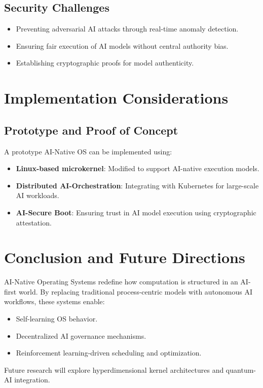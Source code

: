 \documentclass{article}
\begin{document}
\subsection{Security Challenges}
\begin{itemize}
    \item Preventing adversarial AI attacks through real-time anomaly detection.
    \item Ensuring fair execution of AI models without central authority bias.
    \item Establishing cryptographic proofs for model authenticity.
\end{itemize}

\section{Implementation Considerations}
\subsection{Prototype and Proof of Concept}
A prototype AI-Native OS can be implemented using:
\begin{itemize}
    \item \textbf{Linux-based microkernel}: Modified to support AI-native execution models.
    \item \textbf{Distributed AI-Orchestration}: Integrating with Kubernetes for large-scale AI workloads.
    \item \textbf{AI-Secure Boot}: Ensuring trust in AI model execution using cryptographic attestation.
\end{itemize}

\section{Conclusion and Future Directions}
AI-Native Operating Systems redefine how computation is structured in an AI-first world. By replacing traditional process-centric models with autonomous AI workflows, these systems enable:
\begin{itemize}
    \item Self-learning OS behavior.
    \item Decentralized AI governance mechanisms.
    \item Reinforcement learning-driven scheduling and optimization.
\end{itemize}
Future research will explore hyperdimensional kernel architectures and quantum-AI integration.
\end{document}
